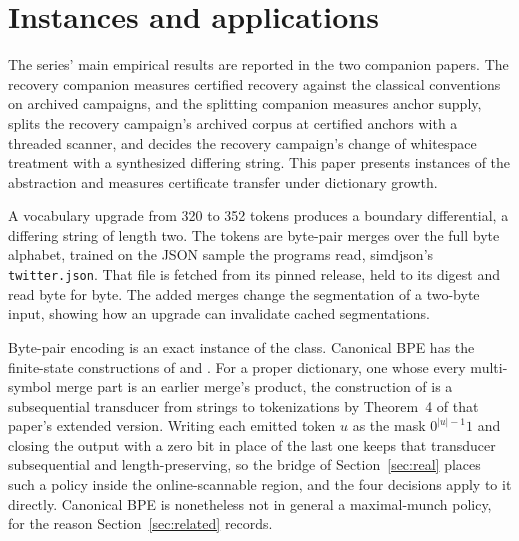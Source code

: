 \documentclass[11pt,a4paper]{article}
\theoremstyle{definition}
\theoremstyle{plain}
\newcommand{\code}[1]{\texttt{#1}}
\begin{document}
\section{Instances and applications}\label{sec:instances}

The series' main empirical results are reported in the two companion papers. The recovery companion measures certified
recovery against the classical conventions on archived campaigns, and the splitting companion measures anchor supply,
splits the recovery campaign's archived corpus at certified anchors with a threaded scanner, and decides the recovery
campaign's change of whitespace treatment with a synthesized differing string. This paper presents instances of the
abstraction and measures certificate transfer under dictionary growth.

A vocabulary upgrade from 320 to 352 tokens produces a boundary differential, a differing string of length two. The
tokens are byte-pair merges over the full byte alphabet, trained on the JSON sample the programs read, simdjson's
\code{twitter.json}. That file is fetched from its pinned release, held to its digest and read byte for byte. The added
merges change the segmentation of a two-byte input, showing how an upgrade can invalidate cached segmentations.

Byte-pair encoding is an exact instance of the class. Canonical BPE has the finite-state constructions of
\citet{cognetta2025tokenization} and \citet{berglund2024bpedfa}. For a proper dictionary, one whose every multi-symbol
merge part is an earlier merge's product, the construction of \citet{berglund2024bpedfa} is a subsequential transducer
from strings to tokenizations by Theorem~4 of that paper's extended version. Writing each emitted token $u$ as the mask
$0^{|u|-1}1$ and closing the output with a zero bit in place of the last one keeps that transducer subsequential and
length-preserving, so the bridge of Section~\ref{sec:real} places such a policy inside the online-scannable region, and
the four decisions apply to it directly. Canonical BPE is nonetheless not in general a maximal-munch policy, for the
reason Section~\ref{sec:related} records.
\end{document}
